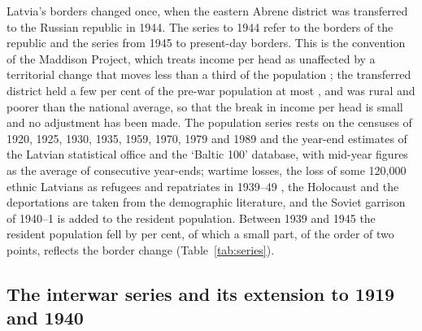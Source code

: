 Latvia's borders changed once, when the eastern Abrene district was transferred to the Russian republic in 1944. The series to 1944 refer to the borders of the republic and the series from 1945 to present-day borders. This is the convention of the Maddison Project, which treats income per head as unaffected by a territorial change that moves less than a third of the population \parencite[629]{maddison_project_paper2014}; the transferred district held a few per cent of the pre-war population at most \parencites[74]{years_of_dependence}[129--30]{hiden_salmon}, and was rural and poorer than the national average, so that the break in income per head is small and no adjustment has been made. The population series rests on the censuses of 1920, 1925, 1930, 1935, 1959, 1970, 1979 and 1989 and the year-end estimates of the Latvian statistical office and the `Baltic 100' database, with mid-year figures as the average of consecutive year-ends; wartime losses, the loss of some 120,000 ethnic Latvians as refugees and repatriates in 1939--49 \parencite[86]{king_1965_economic}, the Holocaust and the deportations are taken from the demographic literature, and the Soviet garrison of 1940--1 is added to the resident population. Between 1939 and 1945 the resident population fell by \lvPOPchangeWARtwo{} per cent, of which a small part, of the order of two points, reflects the border change (Table~\ref{tab:series}).

\subsection{The interwar series and its extension to 1919 and 1940}

